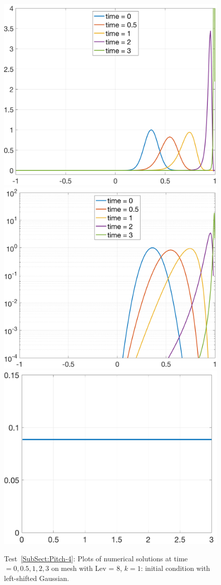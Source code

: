\documentclass[preprint,11pt]{elsarticle}
\begin{document}
\begin{figure}[H]
\centering
\includegraphics[width=.32\textwidth]{./NumFig/Test4-3-3-L8D2}
\includegraphics[width=.32\textwidth]{./NumFig/Test4-3-3-L8D2-log}
\includegraphics[width=.32\textwidth]{./NumFig/Test4-3-k1-3-Con_v2}
\caption{Test~\ref{SubSect:Pitch-4}: Plots of numerical solutions at time $=0,0.5,1,2,3$ on mesh with Lev = 8, $k=1$: initial condition with left-shifted Gaussian.}\label{Fig:Pitch-3-2}
\end{figure}
\end{document}
